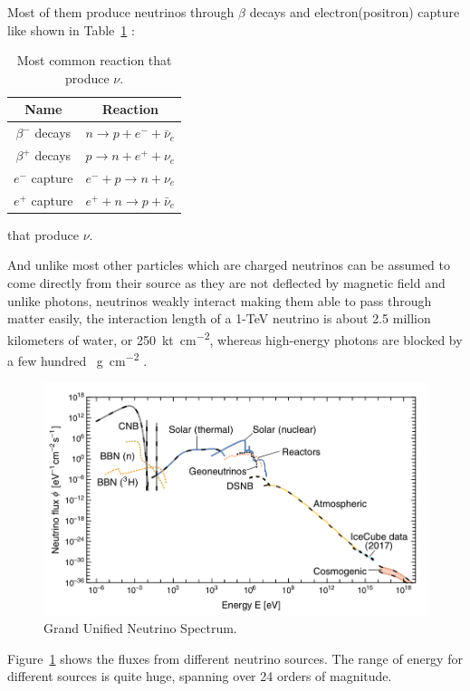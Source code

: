 Most of them produce neutrinos through $\beta$ decays and electron(positron) capture like shown in Table~\ref{tab:reaction}  :
\begin{table}[H]
	\centering
	\caption{Most common reaction that produce $\nu$.}
	\label{tab:reaction}
	\begin{tabular}{cc}
		\toprule
		Name & Reaction \\
		\midrule
		$\beta^-$ decays & $n\rightarrow p+e^-+\bar\nu_e$ \\
		$\beta^+$ decays & $p\rightarrow n+e^++\nu_e$ \\
		$e^-$ capture & $e^-+p\rightarrow n+\nu_e$ \\
		$e^+$ capture & $e^++n\rightarrow p+\bar\nu_e$ \\
		\bottomrule
	\end{tabular}
\end{table}
that produce $\nu$.

And unlike most other particles which are charged neutrinos can be assumed to come directly from their source as they are not deflected by magnetic field and unlike photons, neutrinos weakly interact making them able to pass through matter easily, the interaction length of a 1-TeV neutrino is about 2.5 million kilometers of water, or \SI{250}{\kilo\tonne\per\centi\meter\squared}, whereas high-energy photons are blocked by a few hundred \SI{}{\gram\per\centi\meter\squared} .
\begin{figure}[H]
	\centering
	\includegraphics[width=\textwidth,height=\textheight]{assets/GUNS.png}
	\caption{Grand Unified Neutrino Spectrum.}
	\label{Graph:Guns}
\end{figure}

Figure~\ref{Graph:Guns}  shows the fluxes from different neutrino sources. The range of energy for different sources is quite huge, spanning over 24 orders of magnitude. 

